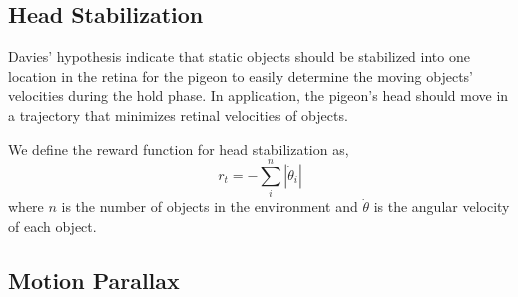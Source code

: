   \subsection{Head Stabilization}
    Davies' hypothesis indicate that static objects should be stabilized into one location in the retina for the pigeon to easily determine the moving objects' velocities during the hold phase. In application, the pigeon's head should move in a trajectory that minimizes retinal velocities of objects.

    We define the reward function for head stabilization as,
    \begin{equation}
      r_t = - \sum_i^n |\dot \theta_i|
    \end{equation}
    where $n$ is the number of objects in the environment and $\dot \theta$ is the angular velocity of each object.

  \subsection{Motion Parallax}


